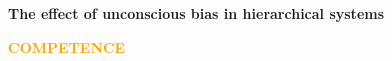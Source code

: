\documentclass{beamer}
\begin{document}


\begin{frame}
    \begin{center}
    \Large \textbf{The effect of unconscious bias in hierarchical systems}
    \end{center}
\end{frame}

\begin{frame}
    \centering
    \hspace{-3.5cm}\LARGE{\textbf{\textcolor{orange}{COMPETENCE}}} \\
    \vspace{1cm}
    \begin{minipage}{0.41\textwidth}
        
    \end{minipage}\hspace{1cm}
    \begin{minipage}{0.481\textwidth}
        
    \end{minipage}
\end{frame}


%         
\end{document}
